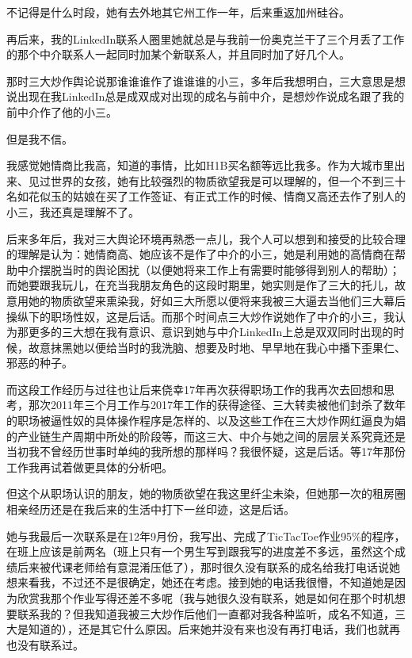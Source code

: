 \documentclass[9pt, b5paper]{article}
\begin{document}
不记得是什么时段，她有去外地其它州工作一年，后来重返加州硅谷。 

再后来，我的LinkedIn联系人圈里她就总是与我前一份奥克兰干了三个月丢了工作的那个中介联系人一起同时加某个新联系人，并且同时加了好几个人。

那时三大炒作舆论说那谁谁谁作了谁谁谁的小三，多年后我想明白，三大意思是想说出现在我LinkedIn总是成双成对出现的成名与前中介，是想炒作说成名跟了我的前中介作了他的小三。 

但是我不信。

我感觉她情商比我高，知道的事情，比如H1B买名额等远比我多。作为大城市里出来、见过世界的女孩，她有比较强烈的物质欲望我是可以理解的，但一个不到三十名如花似玉的姑娘在买了工作签证、有正式工作的时候、情商又高还去作了别人的小三，我还真是理解不了。

后来多年后，我对三大舆论环境再熟悉一点儿，我个人可以想到和接受的比较合理的理解是认为：她情商高、她应该不是作了中介的小三，她是利用她的高情商在帮助中介摆脱当时的舆论困扰（以便她将来工作上有需要时能够得到别人的帮助）；而她要跟我玩儿，在充当我朋友角色的这段时期里，她实则是作了三大的托儿，故意用她的物质欲望来熏染我，好如三大所愿以便将来我被三大逼去当他们三大幕后操纵下的职场性奴，这是后话。而那个时间点三大炒作说她作了中介的小三，我认为那更多的三大想在我有意识、意识到她与中介LinkedIn上总是双双同时出现的时候，故意抹黑她以便给当时的我洗脑、想要及时地、早早地在我心中播下歪果仁、邪恶的种子。

而这段工作经历与过往也让后来侥幸17年再次获得职场工作的我再次去回想和思考，那次2011年三个月工作与2017年工作的获得途径、三大转卖被他们封杀了数年的职场被逼性奴的具体操作程序是怎样的、以及这些工作在三大炒作网红逼良为娼的产业链生产周期中所处的阶段等，而这三大、中介与她之间的层层关系究竟还是当初我不曾经历世事时单纯的我所想的那样吗？我很怀疑，这是后话。等17年那份工作我再试着做更具体的分析吧。 

但这个从职场认识的朋友，她的物质欲望在我这里纤尘未染，但她那一次的租房圈相亲经历还是在我后来的生活中打下一丝印迹，这是后话。 

她与我最后一次联系是在12年9月份，我写出、完成了TicTacToe作业95\%的程序，在班上应该是前两名（班上只有一个男生写到跟我写的进度差不多远，虽然这个成绩后来被代课老师给有意混淆压低了），那时很久没有联系的成名给我打电话说她想来看我，不过还不是很确定，她还在考虑。接到她的电话我很懵，不知道她是因为欣赏我那个作业写得还差不多呢（我与她很久没有联系，她是如何在那个时机想要联系我的？但我知道我被三大炒作后他们一直都对我各种监听，成名不知道，三大是知道的），还是其它什么原因。后来她并没有来也没有再打电话，我们也就再也没有联系过。 
\end{document}
